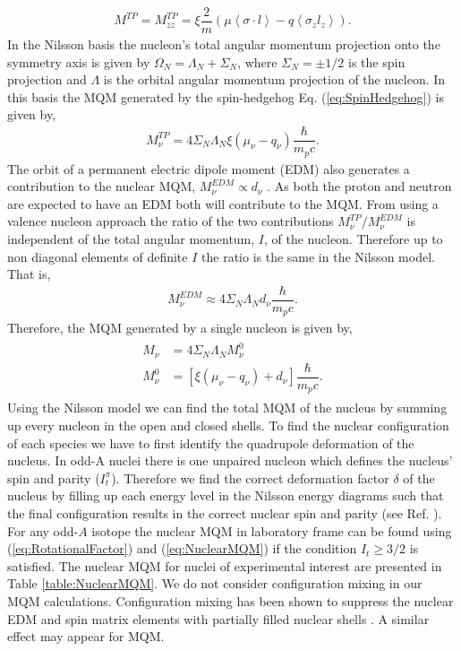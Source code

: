 \documentclass[8pt,a4paper, twoside]{report}
\begin{document}
\begin{align}
M^{TP}  = M_{zz}^{TP} = \xi\dfrac{2}{m}\left(\mu\left<\sigma\cdot l \right> - q\left<\sigma_z l_z\right>\right) .
\end{align}
In the Nilsson basis \cite{Nilsson1955} the nucleon's total angular momentum projection onto the symmetry axis is given by $\Omega_N = \Lambda_N + \Sigma_N$, where $\Sigma_N = \pm 1/2$ is the spin projection and $\Lambda$ is the orbital angular momentum projection of the nucleon. In this basis the MQM  generated by the spin-hedgehog Eq. (\ref{eq:SpinHedgehog}) is given by,
\begin{align}
M^{TP}_{\nu} = 4\Sigma_N\Lambda_N\xi\left(\mu_{\nu} - q_{\nu}\right)\dfrac{\hbar}{m_p c}.
\end{align} 
The orbit of a permanent electric dipole moment (EDM) also  generates a contribution to the nuclear MQM, $M_{\nu}^{EDM} \propto d_{\nu}$ \cite{Khriplovich1976}. As both the proton and neutron are expected to have an EDM both will contribute to the MQM. From \cite{Flambaum2014} using a valence nucleon approach the ratio of the two contributions $M^{TP}_{\nu}/M_{\nu}^{EDM}$ is independent of the total angular momentum, $I$, of the nucleon. Therefore up to non diagonal elements of definite $I$ the ratio is the same in the Nilsson model. That is,
\begin{align}
M_{\nu}^{EDM} \approx  4\Sigma_N\Lambda_N d_{\nu}\dfrac{\hbar}{m_p c}.
\end{align}
Therefore, the MQM generated by a single nucleon is given by,
\begin{align}\label{eq:NuclearMQM} 
\begin{split}
M_{\nu} &= 4\Sigma_N\Lambda_N M_{\nu}^0 \\ 
M_{\nu}^0 &= \left[\xi\left(\mu_{\nu} - q_{\nu}\right) + d_{\nu}\right]\dfrac{\hbar}{m_p c}. 
\end{split}
\end{align}
Using the Nilsson model we can find the total MQM of the nucleus by summing up every nucleon in the open and closed shells. To find the nuclear configuration of each species we have to first identify the quadrupole deformation of the nucleus. In  odd-A nuclei there is  one unpaired nucleon which defines the nucleus' spin  and parity ($I_t^{\pi}$). Therefore we find the correct deformation factor $\delta$ of the nucleus by filling up each energy level in the Nilsson energy diagrams \cite{BohrMottVol2} such that the final configuration results in the correct nuclear spin and parity (see Ref. \cite{BF2018}).   For any odd-$A$ isotope the nuclear MQM in laboratory frame can be found  using (\ref{eq:RotationalFactor})  and (\ref{eq:NuclearMQM}) if the condition $I_t \geq 3/2$ is satisfied. The nuclear MQM  for nuclei of experimental interest are presented in  Table \ref{table:NuclearMQM}. We do not consider configuration mixing in our MQM calculations. Configuration mixing has been shown to suppress the nuclear EDM and spin matrix elements with partially filled nuclear shells \cite{Yoshinaga2010, Yoshinaga2014, Yamanaka2017}. A similar effect may appear for MQM. \\
\end{document}
